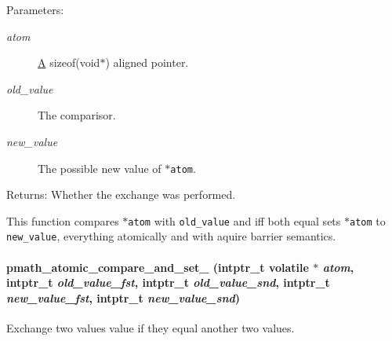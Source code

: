 \begin{Desc}
\item[Parameters:]
\begin{description}
\item[{\em atom}]\hyperlink{class_a}{A} sizeof(void$\ast$) aligned pointer. \item[{\em old\_\-value}]The comparisor. \item[{\em new\_\-value}]The possible new value of {\tt $\ast$atom}. \end{description}
\end{Desc}
\begin{Desc}
\item[Returns:]Whether the exchange was performed.\end{Desc}
This function compares {\tt $\ast$atom} with {\tt old\_\-value} and iff both equal sets {\tt $\ast$atom} to {\tt new\_\-value}, everything atomically and with aquire barrier semantics. \hypertarget{group__atomic__ops_g868adc2a74d7aafbb0670922f61a21cc}{
\paragraph[{pmath\_\-atomic\_\-compare\_\-and\_\-set\_\-2}]{ pmath\_\-atomic\_\-compare\_\-and\_\-set\_ (intptr\_\-t volatile $\ast$ {\em atom}, \/  intptr\_\-t {\em old\_\-value\_\-fst}, \/  intptr\_\-t {\em old\_\-value\_\-snd}, \/  intptr\_\-t {\em new\_\-value\_\-fst}, \/  intptr\_\-t {\em new\_\-value\_\-snd})}\hfill}
\label{group__atomic__ops_g868adc2a74d7aafbb0670922f61a21cc}


Exchange two values value if they equal another two values. 

